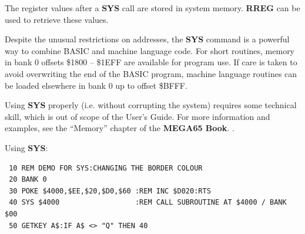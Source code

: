 \begin{description}[leftmargin=2cm,style=nextline]
\item [Remarks:] The register values after a {\bf SYS} call are stored
                 in system memory. {\bf RREG} can be used to retrieve these values.

                 Despite the unusual restrictions on addresses, the {\bf SYS}
                 command is a powerful way to combine BASIC and machine
                 language code. For short routines, memory in bank 0 offsets
                 \$1800 -- \$1EFF are available for program use. If care is
                 taken to avoid overwriting the end of the BASIC program,
                 machine language routines can be loaded elsewhere in bank 0
                 up to offset \$BFFF.

                 Using {\bf SYS} properly (i.e. without corrupting the system)
                 requires some technical skill, which is out of scope of the User's Guide.
                 For more information and examples, see
\ifdefined\printmanual
the ``Memory'' chapter of the {\bf MEGA65 Book}.
\else
{}.
\fi

\item [Example:] Using {\bf SYS}:
\begin{tcolorbox}[colback=black,coltext=white]
\verbatimfont{\codefont}
\begin{verbatim}
 10 REM DEMO FOR SYS:CHANGING THE BORDER COLOUR
 20 BANK 0
 30 POKE $4000,$EE,$20,$D0,$60 :REM INC $D020:RTS
 40 SYS $4000                  :REM CALL SUBROUTINE AT $4000 / BANK $00
 50 GETKEY A$:IF A$ <> "Q" THEN 40
\end{verbatim}
\end{tcolorbox}

\end{description}


\newpage
